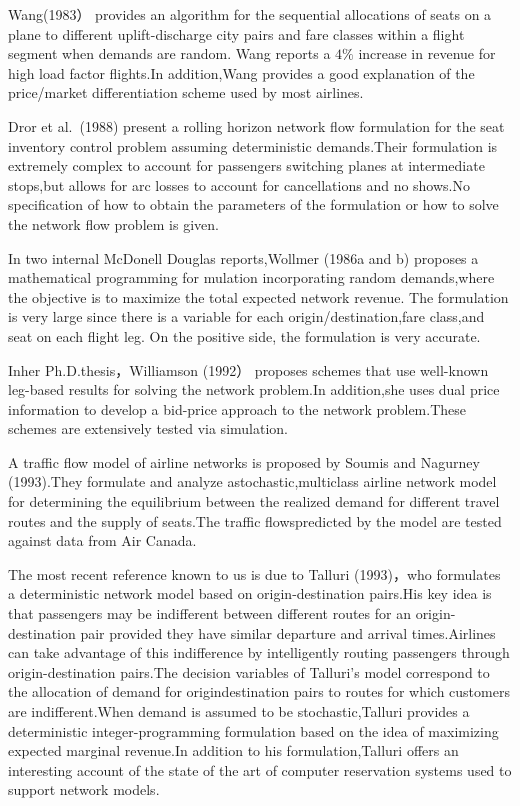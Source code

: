 Wang(1983） provides an algorithm for the sequential allocations of seats on a plane to different uplift-discharge city pairs and fare classes within a flight segment when demands are random. Wang reports a \(4 \%\) increase in revenue for high load factor flights.In addition,Wang provides a good explanation of the price/market differentiation scheme used by most airlines.

Dror et al.~(1988) present a rolling horizon network flow formulation for the seat inventory control problem assuming deterministic demands.Their formulation is extremely complex to account for passengers switching planes at intermediate stops,but allows for arc losses to account for cancellations and no shows.No specification of how to obtain the parameters of the formulation or how to solve the network flow problem is given.

In two internal McDonell Douglas reports,Wollmer (1986a and b) proposes a mathematical programming for mulation incorporating random demands,where the objective is to maximize the total expected network revenue. The formulation is very large since there is a variable for each origin/destination,fare class,and seat on each flight leg. On the positive side, the formulation is very accurate.

Inher Ph.D.thesis，Williamson (1992） proposes schemes that use well-known leg-based results for solving the network problem.In addition,she uses dual price information to develop a bid-price approach to the network problem.These schemes are extensively tested via simulation.

A traffic flow model of airline networks is proposed by Soumis and Nagurney (1993).They formulate and analyze astochastic,multiclass airline network model for determining the equilibrium between the realized demand for different travel routes and the supply of seats.The traffic flowspredicted by the model are tested against data from Air Canada.

The most recent reference known to us is due to Talluri (1993)，who formulates a deterministic network model based on origin-destination pairs.His key idea is that passengers may be indifferent between different routes for an origin-destination pair provided they have similar departure and arrival times.Airlines can take advantage of this indifference by intelligently routing passengers through origin-destination pairs.The decision variables of Talluri's model correspond to the allocation of demand for origindestination pairs to routes for which customers are indifferent.When demand is assumed to be stochastic,Talluri provides a deterministic integer-programming formulation based on the idea of maximizing expected marginal revenue.In addition to his formulation,Talluri offers an interesting account of the state of the art of computer reservation systems used to support network models.

